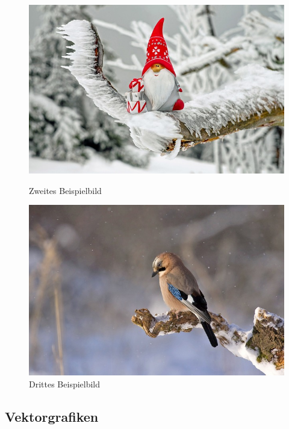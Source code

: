 \documentclass[11pt,a4paper,hidelinks]{article}
\begin{document}
\begin{figure}[H]
    \begin{minipage}[b]{0.48\textwidth}
        \centering
        \includegraphics[width=\textwidth]{graphics/example2.jpg}
        \caption[Zweites Beispielbild]{Zweites Beispielbild}\label{fig:example2}
    \end{minipage}
    \hfill
    \begin{minipage}[b]{0.48\textwidth}
        \centering
        \includegraphics[width=\textwidth]{graphics/example3.jpg}
        \caption[Drittes Beispielbild]{Drittes Beispielbild}\label{fig:example3}
    \end{minipage}
\end{figure}

\subsection{Vektorgrafiken}\label{sec:vektorgrafiken}
\end{document}

